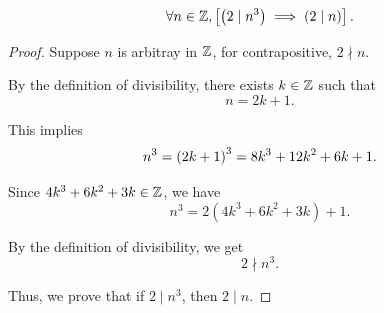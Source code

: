 \begin{lemma}
    \begin{equation*}
        \forall n \in \mathbb{Z}, \left[\left(2 \mid n^3\right) \implies \left(2 \mid n\right)\right].
    \end{equation*}
\end{lemma}

\begin{proof}
    Suppose $n$ is arbitray in $\mathbb{Z}$, for contrapositive, $2 \nmid n$. 

    By the definition of divisibility, there exists $k \in \mathbb{Z}$ such that 
    \begin{equation*}
        n = 2k + 1. 
    \end{equation*}

    This implies 
    \begin{equation*}
        n^3 = \left(2k + 1\right)^3 = 8k^3 + 12k^2 + 6k + 1.
    \end{equation*}

    Since $4k^3 + 6k^2 + 3k \in \mathbb{Z}$, we have 
    \begin{equation*}
        n^3 = 2(4k^3 + 6k^2 + 3k) + 1.
    \end{equation*}

    By the definition of divisibility, we get 
    \begin{equation*}
        2 \nmid n^3. 
    \end{equation*}

    Thus, we prove that if $2 \mid n^3$, then $2 \mid n$. 
\end{proof}